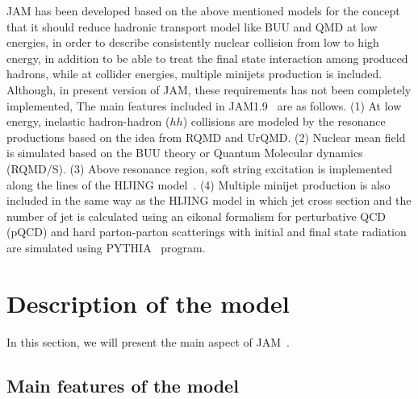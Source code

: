 \documentclass[]{article}
\def\VERSION{1.9}
\begin{document}
JAM has been developed based on the above mentioned models
 for the concept that
 it should reduce hadronic transport model like BUU and QMD at low energies,
 in order to describe consistently nuclear collision from low to 
 high energy, in addition to be able to treat the final state
 interaction among produced hadrons,
 while at collider energies, multiple minijets production is 
 included.
Although, in present version of JAM, these requirements has not been
 completely implemented,
The main features included in JAM\VERSION~ are as follows.
 (1) At low energy, inelastic hadron-hadron ($hh$) collisions are modeled by
     the resonance productions based on the idea from RQMD and UrQMD.
 (2) Nuclear mean field is simulated based on the BUU theory or
     Quantum Molecular dynamics (RQMD/S).
 (3) Above resonance region, soft string excitation is implemented
     along the lines of the HIJING model~\cite{hijing}.
 (4) Multiple minijet production is also included in the same way
     as the HIJING model in which jet cross section and the number
     of jet is calculated using an eikonal formalism for
     perturbative QCD (pQCD) and hard parton-parton scatterings
     with initial and final state radiation are simulated
     using PYTHIA~\cite{pythia} program.








\section{Description of the model}

In this section, we will present the main aspect of JAM~\cite{jam}.

\subsection{Main features of the model}
\end{document}
